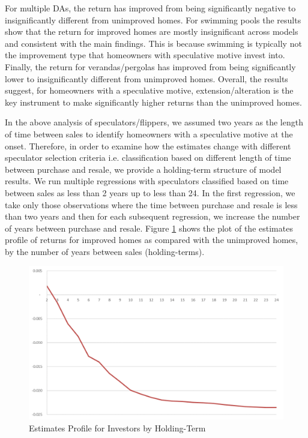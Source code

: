 \documentclass[AEJ,reqno, draftmode]{AEA} %
\begin{document}
For multiple DAs, the return has improved from being significantly negative to insignificantly different from unimproved homes. For swimming pools the results show that the return for improved homes are mostly insignificant across models and consistent with the main findings. This is because swimming is typically not the improvement type that homeowners with speculative motive invest into. Finally, the return for verandas/pergolas has improved from being significantly lower to insignificantly different from unimproved homes. Overall, the results suggest, for homeowners with a speculative motive, extension/alteration is the key instrument to make significantly higher returns than the unimproved homes.

In the above analysis of speculators/flippers, we assumed two years as the length of time between sales to identify homeowners with a speculative motive at the onset. Therefore, in order to examine how the estimates change with different speculator selection criteria i.e. classification based on different length of time between purchase and resale, we provide a holding-term structure of model results. We run multiple regressions with speculators classified based on time between sales as less than 2 years up to less than 24. In the first regression, we take only those observations where the time between purchase and resale is less than two years and then for each subsequent regression, we increase the number of years between purchase and resale. Figure \ref{fig:relative_returns_by_investor} shows the plot of the estimates profile of returns for improved homes as compared with the unimproved homes, by the number of years between sales (holding-terms).

\begin{figure}[!ht]
    \centering
     \includegraphics[width=\columnwidth]{Figures/regression_24_after_ACT_NT.png} \par
 \caption{Estimates Profile for Investors by Holding-Term}
 \vspace{-20pt}
 \label{fig:relative_returns_by_investor}
\end{figure} 
\end{document}
